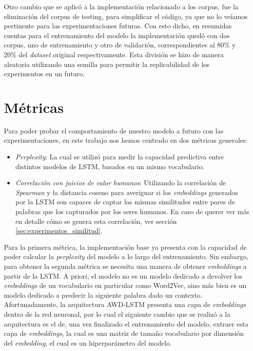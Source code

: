 Otro cambio que se aplicó a la implementación relacionado a los corpus, fue la eliminación del corpus de testing, para simplificar el código, ya que no lo veíamos pertinente para las experimentaciones futuras. Con esto dicho, en resumidas cuentas para el entrenamiento del modelo la implementación quedó con dos corpus, uno de entrenamiento y otro de validación, correspondientes al 80\% y 20\% del \textit{dataset} original respectivamente. Esta división se hizo de manera aleatoria utilizando una semilla para permitir la replicabilidad de los experimentos en un futuro.

\section{Métricas}
Para poder probar el comportamiento de nuestro modelo a futuro con las experimentaciones, en este trabajo nos hemos centrado en dos métricas generales:

\begin{itemize}
    \item \textit{Perplexity}: La cual se utilizó para medir la capacidad predictiva entre distintos modelos de LSTM, basados en un mismo vocabulario.
    \item \textit{Correlación con juicios de valor humanos}: Utilizando la correlación de \textit{Spearman} y la distancia coseno para averiguar si los \textit{embeddings} generados por la LSTM son capaces de captar las mismas similitudes entre pares de palabras que los capturados por los seres humanos. En caso de querer ver más en detalle cómo se genera esta correlación, ver sección \ref{sec:experimentos_similitud}.
\end{itemize}

Para la primera métrica, la implementación base ya presenta con la capacidad de poder calcular la \textit{perplexity} del modelo a lo largo del entrenamiento. Sin embargo, para obtener la segunda métrica se necesita una manera de obtener \textit{embeddings} a partir de la LSTM. A priori, el modelo no es un modelo dedicado a devolver los \textit{embeddings} de un vocabulario en particular como Word2Vec, sino más bien es un modelo dedicado a predecir la siguiente palabra dado un contexto. Afortunadamente, la arquitectura AWD-LSTM presenta una capa de \textit{embeddings} dentro de la red neuronal, por lo cual el siguiente cambio que se realizó a la arquitectura es el de, una vez finalizado el entrenamiento del modelo, extraer esta capa de \textit{embeddings}, la cual es una matriz de tamaño vocabulario por dimensión del \textit{embedding}, el cual es un hiperparámetro del modelo. 

